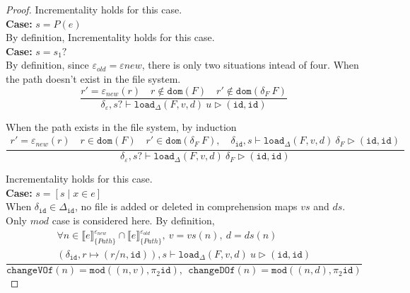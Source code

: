 \documentclass[10pt,twoside,a4paper]{article}
\theoremstyle{theorem}
\theoremstyle{lemma}
\theoremstyle{property}
\theoremstyle{definition}
\theoremstyle{assumption}
\def\snd{\pi_2}
\def\id{\mathtt{id}}
\begin{document}
\begin{proof}
	Incrementality holds for this case.\\

	\textbf{Case: } $s = P(e)$\\

		By definition, Incrementality holds for this case.\\

	\textbf{Case: } $s = s_1?$\\

	By definition, since $\varepsilon_{old} = \varepsilon{new}$, there is only two situations intead of four. When the path doesn't exist in the file system.
	\begin{displaymath}
	\frac{
		r' = \varepsilon_{new}(r) \quad r \notin \mathtt{dom}(F) \quad r' \notin \mathtt{dom}(\delta_F~F)
	}
	{\delta_\varepsilon, s? \vdash \mathtt{load}_\Delta (F,v,d)~ u \rhd (\mathtt{id}, \mathtt{id})}
	\end{displaymath}

	When the path exists in the file system, by induction
	\begin{displaymath}
	\frac{\begin{array}{c}
	r' = \varepsilon_{new}(r) \quad r \in \mathtt{dom}(F) \quad r' \in \mathtt{dom}(\delta_F~F), \quad
		\delta_{\id}, s \vdash \mathtt{load}_\Delta (F,v,d)~ \delta_F \rhd (\id, \id)
	\end{array}}
	{\delta_\varepsilon, s? \vdash \mathtt{load}_\Delta (F,v,d)~ \delta_F \rhd (\id,\id)}
	\end{displaymath}

	Incrementality holds for this case.\\

	\textbf{Case: } $s = [ s \mid x \in e]$\\

	When $\delta_{\id} \in \Delta_{\id}$, no file is added or deleted in comprehension maps $vs$ and $ds$. Only $mod$ case is considered here. By definition,
	\begin{displaymath}
		\frac{\begin{array}{c}
		\forall n \in \llbracket e \rrbracket^{\varepsilon_{new}}_{\{Path\}} \cap \llbracket e \rrbracket^{\varepsilon_{old}}_{\{Path\}}, ~ v = vs(n), ~d = ds(n)\\
		(\delta_{\id}, r \mapsto (r/n, \id)), s \vdash \mathtt{load}_\Delta (F,v,d)~ u \rhd (\id,\id)
		\end{array}}
		{\mathtt{changeVOf}(n) = \mathtt{mod}((n,v), \snd\id), ~~\mathtt{changeDOf}(n) = \mathtt{mod}((n,d), \snd\id)}
	\end{displaymath}


\end{proof}
\end{document}

